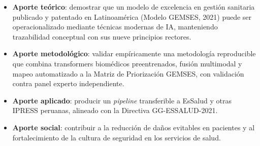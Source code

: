 \documentclass[11pt,a4paper]{article}
\begin{document}
\begin{itemize}
  \item \textbf{Aporte teórico}: demostrar que un modelo de excelencia en gestión sanitaria publicado y patentado en Latinoamérica (Modelo GEMSES, 2021) puede ser operacionalizado mediante técnicas modernas de IA, manteniendo trazabilidad conceptual con sus nueve principios rectores.
  \item \textbf{Aporte metodológico}: validar empíricamente una metodología reproducible que combina transformers biomédicos preentrenados, fusión multimodal y mapeo automatizado a la Matriz de Priorización GEMSES, con validación contra panel experto independiente.
  \item \textbf{Aporte aplicado}: producir un \textit{pipeline} transferible a EsSalud y otras IPRESS peruanas, alineado con la Directiva GG-ESSALUD-2021.
  \item \textbf{Aporte social}: contribuir a la reducción de daños evitables en pacientes y al fortalecimiento de la cultura de seguridad en los servicios de salud.
\end{itemize}

\newpage
\end{document}
